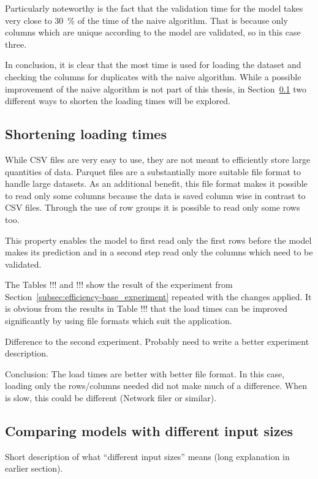 Particularly noteworthy is the fact that the validation time for the model takes very close to \SI{30}{\percent} of the time of the naive algorithm. That is because only columns which are unique according to the model are validated, so in this case three.

In conclusion, it is clear that the most time is used for loading the dataset and checking the columns for duplicates with the naive algorithm. While a possible improvement of the naive algorithm is not part of this thesis, in Section~\ref{subsec:efficiency-shorter_loading_times} two different ways to shorten the loading times will be explored.


\subsection{Shortening loading times}\label{subsec:efficiency-shorter_loading_times} %
While CSV files are very easy to use, they are not meant to efficiently store large quantities of data. Parquet files are a substantially more suitable file format to handle large datasets. As an additional benefit, this file format makes it possible to read only some columns because the data is saved column wise in contrast to CSV files. %
Through the use of row groups it is possible to read only some rows too.

This property enables the model to first read only the first rows before the model makes its prediction and in a second step read only the columns which need to be validated.

The Tables !!! and !!! show the result of the experiment from Section~\ref{subsec:efficiency-base_experiment} repeated with the changes applied. It is obvious from the results in Table !!! that the load times can be improved significantly by using file formats which suit the application.

Difference to the second experiment. Probably need to write a better experiment description.

Conclusion: The load times are better with better file format. In this case, loading only the rows/columns needed did not make much of a difference. When \io{} is slow, this could be different (Network filer or similar).


\subsection{Comparing models with different input sizes}\label{subsec:efficiency-comparing_models} %
Short description of what \enquote{different input sizes} means (long explanation in earlier section).

